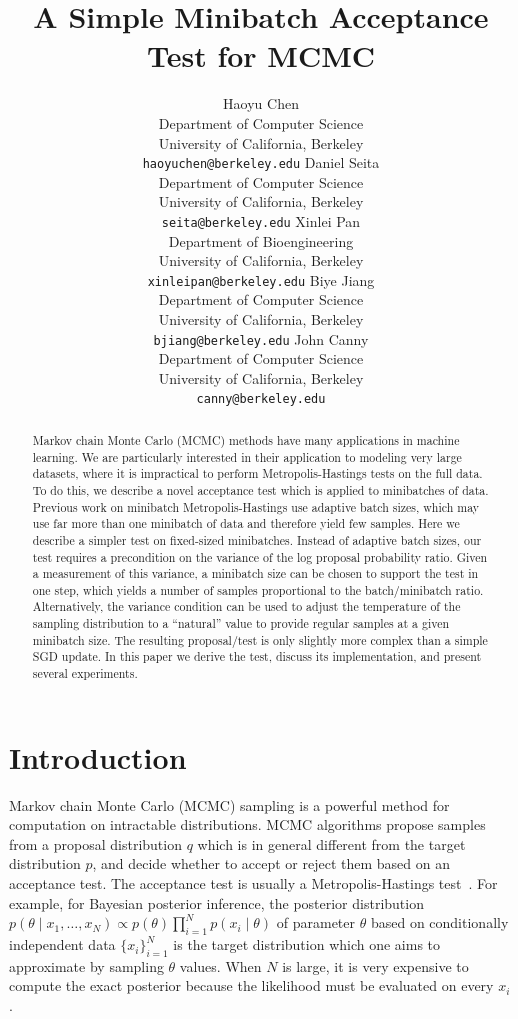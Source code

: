 \documentclass{article}
\title{A Simple Minibatch Acceptance Test for MCMC}
\author{
  Haoyu Chen \\
  Department of Computer Science \\
  University of California, Berkeley \\
  \texttt{haoyuchen@berkeley.edu}
  \And
  Daniel Seita \\
  Department of Computer Science \\
  University of California, Berkeley \\
  \texttt{seita@berkeley.edu}
  \And
  Xinlei Pan \\
  Department of Bioengineering \\
  University of California, Berkeley \\
  \texttt{xinleipan@berkeley.edu}
  \And 
  Biye Jiang \\
  Department of Computer Science \\
  University of California, Berkeley \\
  \texttt{bjiang@berkeley.edu}
  \And
  John Canny \\
  Department of Computer Science \\
  University of California, Berkeley \\
  \texttt{canny@berkeley.edu}
}
\begin{document}
\maketitle

\begin{abstract}
Markov chain Monte Carlo (MCMC) methods have many applications in
machine learning. We are particularly interested in their application
to modeling very large datasets, where it is impractical to
perform Metropolis-Hastings tests on the full data. To do this, we
describe a novel acceptance test which is applied to minibatches of
data. Previous work on minibatch Metropolis-Hastings use adaptive
batch sizes, which may use far more than one minibatch of data and therefore
yield few samples.  Here we describe a simpler test on fixed-sized
minibatches. Instead of adaptive batch sizes, our test requires a
precondition on the variance of the log proposal probability
ratio. Given a measurement of this variance, a minibatch size can be
chosen to support the test in one step, which yields a number of
samples proportional to the batch/minibatch ratio. Alternatively, the
variance condition can be used to adjust the temperature of the
sampling distribution to a ``natural'' value to provide regular
samples at a given minibatch size. The resulting proposal/test is only
slightly more complex than a simple SGD update. In this paper we
derive the test, discuss its implementation, and present several
experiments.
\end{abstract}



\section{Introduction}\label{sec:introduction}

Markov chain Monte Carlo (MCMC) sampling is a powerful method for
computation on intractable distributions. MCMC algorithms propose
samples from a proposal distribution $q$ which is in general different
from the target distribution $p$, and decide whether to accept or
reject them based on an acceptance test. The acceptance test is
usually a Metropolis-Hastings
test~\cite{Metropolis1953,hastings70}. For example, for Bayesian
posterior inference, the posterior distribution $p(\theta \mid x_1,
\ldots, x_N) \propto p(\theta)\prod_{i=1}^N p(x_i \mid \theta)$ of
parameter $\theta$ based on conditionally independent data
$\{x_i\}_{i=1}^N$ is the target distribution which one aims to
approximate by sampling $\theta$ values. When $N$ is large, it is
very expensive to compute the exact posterior because the
likelihood must be evaluated on every $x_i$.
\end{document}

